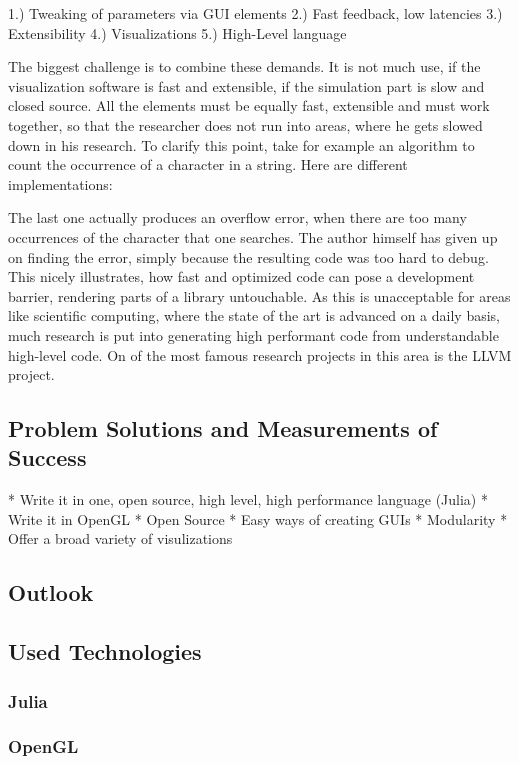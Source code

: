 1.) Tweaking of parameters via GUI elements
2.) Fast feedback, low latencies
3.) Extensibility
4.) Visualizations
5.) High-Level language

The biggest challenge is to combine these demands. It is not much use, if the visualization software is fast and extensible, if the simulation part is slow and closed source. All the elements must be equally fast, extensible and must work together, so that the researcher does not run into areas, where he gets slowed down in his research.
To clarify this point, take for example an algorithm to count the occurrence of a character in a string.
Here are different implementations:


The last one actually produces an overflow error, when there are too many occurrences of the character that one searches.
The author himself has given up on finding the error, simply because the resulting code was too hard to debug.
This nicely illustrates, how fast and optimized code can pose a development barrier, rendering parts of a library untouchable.
As this is unacceptable for areas like scientific computing, where the state of the art is advanced on a daily basis, much research is put into generating high performant code from understandable high-level code.
On of the most famous research projects in this area is the LLVM project.



\subsection{Problem Solutions and Measurements of Success}
* Write it in one, open source, high level, high performance language (Julia)
* Write it in OpenGL
* Open Source
* Easy ways of creating GUIs
* Modularity
* Offer a broad variety of visulizations


\subsection{Outlook}

\subsection{Used Technologies}

\subsubsection{Julia}
\subsubsection{OpenGL}


